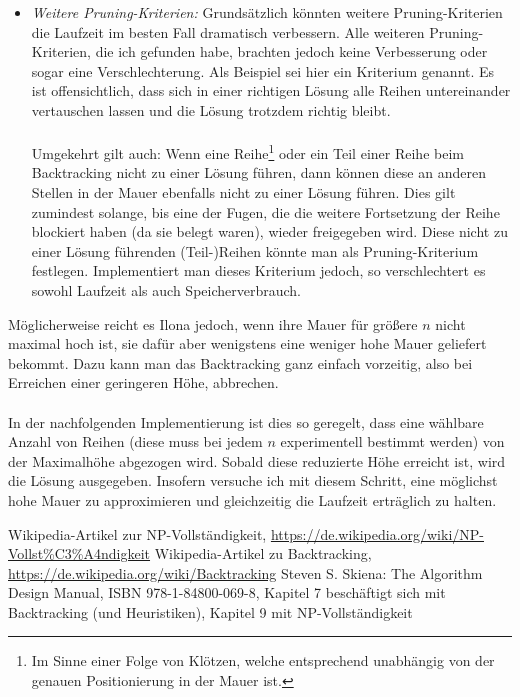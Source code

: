 \documentclass[a4paper, notitlepage, 12pt]{scrartcl}
\begin{document}
\begin{itemize}
\item \textit{Weitere Pruning-Kriterien:} Grundsätzlich könnten weitere Pruning-Kriterien die Laufzeit im besten Fall dramatisch verbessern. Alle weiteren Pruning-Kriterien, die ich gefunden habe, brachten jedoch keine Verbesserung oder sogar eine Verschlechterung. Als Beispiel sei hier ein Kriterium genannt. Es ist offensichtlich, dass sich in einer richtigen Lösung alle Reihen untereinander vertauschen lassen und die Lösung trotzdem richtig bleibt. \\ \\ Umgekehrt gilt auch: Wenn eine Reihe\footnote{Im Sinne einer Folge von Klötzen, welche entsprechend unabhängig von der genauen Positionierung in der Mauer ist.} oder ein Teil einer Reihe beim Backtracking nicht zu einer Lösung führen, dann können diese an anderen Stellen in der Mauer ebenfalls nicht zu einer Lösung führen. Dies gilt zumindest solange, bis eine der Fugen, die die weitere Fortsetzung der Reihe blockiert haben (da sie belegt waren), wieder freigegeben wird. Diese nicht zu einer Lösung führenden (Teil-)Reihen könnte man als Pruning-Kriterium festlegen. Implementiert man dieses Kriterium jedoch, so verschlechtert es sowohl Laufzeit als auch Speicherverbrauch.
\end{itemize}
Möglicherweise reicht es Ilona jedoch, wenn ihre Mauer für größere $n$ nicht maximal hoch ist, sie dafür aber wenigstens eine weniger hohe Mauer geliefert bekommt. Dazu kann man das Backtracking ganz einfach vorzeitig, also bei Erreichen einer geringeren Höhe, abbrechen. \\ \\ In der nachfolgenden Implementierung ist dies so geregelt, dass eine wählbare Anzahl von Reihen (diese muss bei jedem $n$ experimentell bestimmt werden) von der Maximalhöhe abgezogen wird. Sobald diese reduzierte Höhe erreicht ist, wird die Lösung ausgegeben. Insofern versuche ich mit diesem Schritt, eine möglichst hohe Mauer zu approximieren und gleichzeitig die Laufzeit erträglich zu halten.
\begin{thebibliography}{xx}
 Wikipedia-Artikel zur NP-Vollständigkeit, \url{https://de.wikipedia.org/wiki/NP-Vollst\%C3\%A4ndigkeit}
 Wikipedia-Artikel zu Backtracking, \url{https://de.wikipedia.org/wiki/Backtracking}
 Steven S. Skiena: The Algorithm Design Manual, ISBN 978-1-84800-069-8, Kapitel 7 beschäftigt sich mit Backtracking (und Heuristiken), Kapitel 9 mit NP-Vollständigkeit
\end{thebibliography}
\end{document}
